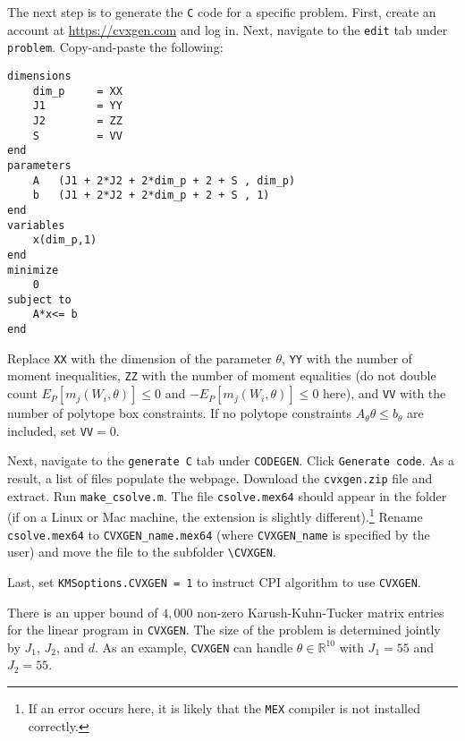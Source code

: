 \documentclass[12pt]{article}
\def\code#1{\texttt{#1}}
\begin{document}
The next step is to generate the \code{C} code for a specific problem.  First, create an account at \url{https://cvxgen.com} and log in.  Next, navigate to the \code{edit} tab under \code{problem}.  Copy-and-paste the following:

\footnotesize
\begin{lstlisting}[backgroundcolor = \color{gray!30},
                   xleftmargin = 0cm,
                   framexleftmargin = 1em]
dimensions
    dim_p     = XX
    J1        = YY
    J2        = ZZ
    S         = VV
end
parameters
    A   (J1 + 2*J2 + 2*dim_p + 2 + S , dim_p)
    b   (J1 + 2*J2 + 2*dim_p + 2 + S , 1)
end
variables
    x(dim_p,1)
end
minimize
    0
subject to
    A*x<= b
end
\end{lstlisting}

 \normalsize
​Replace \code{XX} with the dimension of the parameter $\theta$, \code{YY} with the number of moment inequalities, \code{ZZ} with the number of moment equalities (do not double count $E_P[m_j(W_i,\theta)] \leq 0$ and $-E_P[m_j(W_i,\theta)] \leq 0$ here), and \code{VV} with the number of polytope box constraints.  If no polytope constraints $A_{\theta} \theta \leq b_{\theta}$ are included, set \code{VV}$=0$.

Next, navigate to the \code{generate C} tab under \code{CODEGEN}.  Click \code{Generate code}.  As a result, a list of files populate the webpage.  Download the \code{cvxgen.zip} file and extract.  Run \code{make\_csolve.m}.  The file \code{csolve.mex64} should appear in the folder (if on a Linux or Mac machine, the extension is slightly different).\footnote{If an error occurs here, it is likely that the \code{MEX} compiler is not installed correctly.}  Rename \code{csolve.mex64} to \code{CVXGEN\_name.mex64} (where \code{CVXGEN\_name} is specified by the user) and move the file to the subfolder  \code{\textbackslash CVXGEN}.

Last, set \code{KMSoptions.CVXGEN = 1} to instruct CPI algorithm to use \code{CVXGEN}.

There is an upper bound of $4,000$ non-zero Karush-Kuhn-Tucker matrix entries for the linear program in \code{CVXGEN}.  The size of the problem is determined jointly by $J_1$, $J_2$, and $d$.  As an example, \code{CVXGEN} can handle $\theta \in \mathbb{R}^{10}$ with $J_1 = 55$ and $J_2 = 55$.
\end{document}
